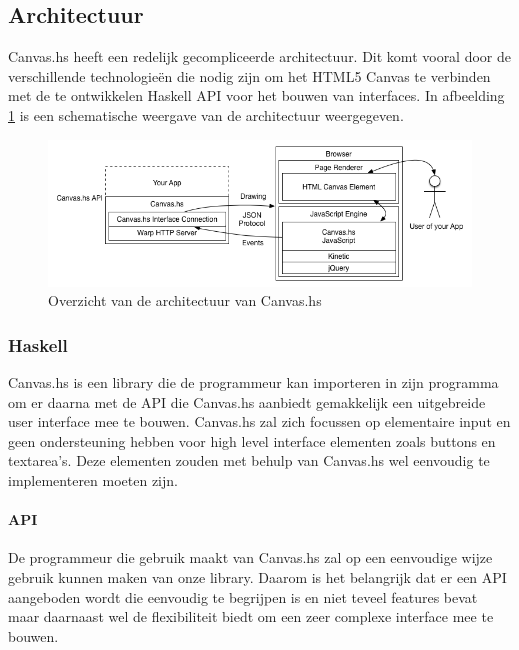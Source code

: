 \subsection{Architectuur}
Canvas.hs heeft een redelijk gecompliceerde architectuur. Dit komt vooral door de verschillende technologieën die nodig zijn om het HTML5 Canvas te verbinden met de te ontwikkelen Haskell API voor het bouwen van interfaces. In afbeelding \ref{fig:overzicht_architectuur} is een schematische weergave van de architectuur weergegeven.

\begin{figure}
\begin{center}
\includegraphics[keepaspectratio,width=\textwidth]{./Hoofdstukken/architecture.png}
\caption{Overzicht van de architectuur van Canvas.hs}
\label{fig:overzicht_architectuur}
\end{center}
\end{figure}

\subsubsection{Haskell}
Canvas.hs is een library die de programmeur kan importeren in zijn programma om er daarna met de API die Canvas.hs aanbiedt gemakkelijk een uitgebreide user interface mee te bouwen. Canvas.hs zal zich focussen op elementaire input en geen ondersteuning hebben voor high level interface elementen zoals buttons en textarea's. Deze elementen zouden met behulp van Canvas.hs wel eenvoudig te implementeren moeten zijn.

\paragraph{API}
De programmeur die gebruik maakt van Canvas.hs zal op een eenvoudige wijze gebruik kunnen maken van onze library. Daarom is het belangrijk dat er een API aangeboden wordt die eenvoudig te begrijpen is en niet teveel features bevat maar daarnaast wel de flexibiliteit biedt om een zeer complexe interface mee te bouwen.

